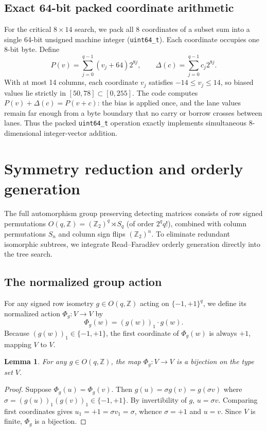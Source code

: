 \documentclass[11pt]{article}
\theoremstyle{plain}
\newtheorem{lemma}[theorem]{Lemma}
\theoremstyle{definition}
\newcommand{\signs}{\{-1,+1\}}
\begin{document}
\subsection{Exact 64-bit packed coordinate arithmetic}

For the critical $8 \times 14$ search, we pack all 8 coordinates of a subset sum into a single 64-bit unsigned machine integer (\texttt{uint64\_t}). Each coordinate occupies one 8-bit byte. Define
\[
  P(v) = \sum_{j=0}^{q-1} (v_j + 64)2^{8j},
  \qquad
  \Delta(c) = \sum_{j=0}^{q-1} c_j2^{8j}.
\]
With at most 14 columns, each coordinate $v_j$ satisfies $-14 \le v_j \le 14$, so biased values lie strictly in $[50,78] \subset [0,255]$. The code computes $P(v)+\Delta(c)=P(v+c)$: the bias is applied once, and the lane values remain far enough from a byte boundary that no carry or borrow crosses between lanes. Thus the packed \texttt{uint64\_t} operation exactly implements simultaneous 8-dimensional integer-vector addition.

\section{Symmetry reduction and orderly generation}\label{sec:orderly}

The full automorphism group preserving detecting matrices consists of row signed permutations $O(q, \mathbb{Z}) = (\mathbb{Z}_2)^q \rtimes S_q$ (of order $2^q q!$), combined with column permutations $S_n$ and column sign flips $(\mathbb{Z}_2)^n$. To eliminate redundant isomorphic subtrees, we integrate Read--Farad\v{z}ev orderly generation \cite{faradzev1978,read1978} directly into the tree search.

\subsection{The normalized group action}

For any signed row isometry $g \in O(q, \mathbb{Z})$ acting on $\signs^q$, we define its normalized action $\Phi_g: V \to V$ by
\[
  \Phi_g(w) = (g(w))_1 \cdot g(w).
\]
Because $(g(w))_1 \in \signs$, the first coordinate of $\Phi_g(w)$ is always $+1$, mapping $V$ to $V$.

\begin{lemma}
For any $g \in O(q, \mathbb{Z})$, the map $\Phi_g: V \to V$ is a bijection on the type set $V$.
\end{lemma}

\begin{proof}
Suppose $\Phi_g(u) = \Phi_g(v)$. Then $g(u) = \sigma g(v) = g(\sigma v)$ where $\sigma = (g(u))_1(g(v))_1 \in \signs$. By invertibility of $g$, $u = \sigma v$. Comparing first coordinates gives $u_1 = +1 = \sigma v_1 = \sigma$, whence $\sigma = +1$ and $u = v$. Since $V$ is finite, $\Phi_g$ is a bijection.
\end{proof}
\end{document}
